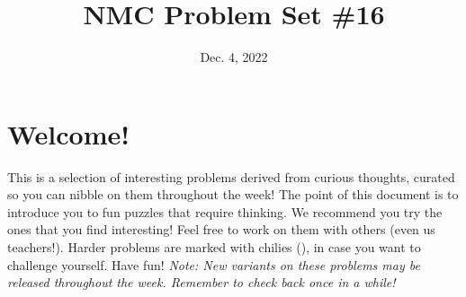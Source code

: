 \documentclass[11pt]{scrartcl}
\begin{document}
\title{NMC Problem Set \#16} %
\date{Dec. 4, 2022} %
\maketitle

\section*{Welcome!}

This is a selection of interesting problems derived from curious thoughts, curated so you can nibble on them throughout the week! The point of this document is to introduce you to fun puzzles that require thinking. We recommend you try the ones that you find interesting! Feel free to work on them with others (even us teachers!). Harder problems are marked with chilies (\fullchili), in case you want to challenge yourself.
\newline\newline
Have fun! \textit{Note: New variants on these problems may be released throughout the week. Remember to check back once in a while!}
    
\end{document}
